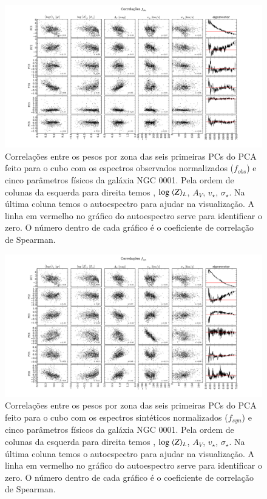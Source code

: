 \begin{figure}
    \includegraphics[width=1.2\textwidth, angle=-90]{figuras/K0008-correl-f_obs_norm-PCvsPhys.pdf}
	\caption[Correlações PCs vs. par\^ametros f\'isicos - $f_{obs}$ - NGC 0001]
    {Correlações entre os pesos por zona das seis primeiras PCs do PCA feito para o cubo com os espectros observados
    normalizados ($f_{obs}$) e cinco parâmetros físicos da galáxia NGC 0001. Pela ordem de colunas da esquerda para
    direita temos , $\log\ \meanL{Z}$, $A_V$, $v_{\star}$, $\sigma_{\star}$. Na última coluna temos o
    autoespectro para ajudar na visualização. A linha em vermelho no gráfico do autoespectro serve para identificar o
    zero. O número dentro de cada gráfico é o coeficiente de correlação de Spearman.}
    \label{fig:K0008correfobsnorm}
\end{figure}

\begin{figure}
    \includegraphics[width=1.2\textwidth, angle=-90]{figuras/K0008-correl-f_syn_norm-PCvsPhys.pdf}
	\caption[Correlações PCs vs. par\^ametros f\'isicos - $f_{syn}$ - NGC 0001]
    {Correlações entre os pesos por zona das seis primeiras PCs do PCA feito para o cubo com os espectros sintéticos
    normalizados ($f_{syn}$) e cinco parâmetros físicos da galáxia NGC 0001. Pela ordem de colunas da esquerda para
    direita temos , $\log\ \meanL{Z}$, $A_V$, $v_{\star}$, $\sigma_{\star}$. Na última coluna temos o
    autoespectro para ajudar na visualização. A linha em vermelho no gráfico do autoespectro serve para identificar o
    zero. O número dentro de cada gráfico é o coeficiente de correlação de Spearman.}
    \label{fig:K0008correfsynnorm}
\end{figure}

